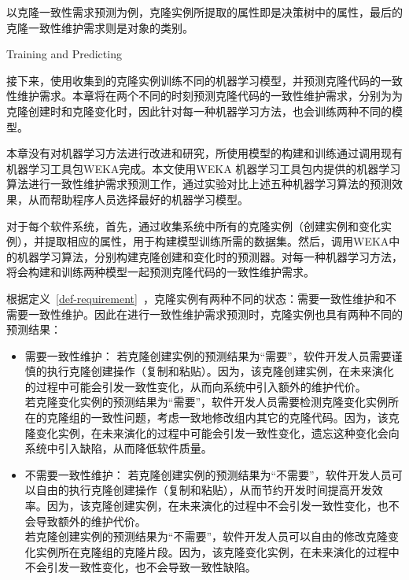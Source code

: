 { 以克隆一致性需求预测为例，克隆实例所提取的属性即是决策树中的属性，最后的克隆一致性维护需求则是对象的类别。

{Training and Predicting}

接下来，使用收集到的克隆实例训练不同的机器学习模型，并预测克隆代码的一致性维护需求。本章将在两个不同的时刻预测克隆代码的一致性维护需求，分别为为克隆创建时和克隆变化时，因此针对每一种机器学习方法，也会训练两种不同的模型。

本章没有对机器学习方法进行改进和研究，所使用模型的构建和训练通过调用现有机器学习工具包WEKA完成。本文使用WEKA 机器学习工具包内提供的机器学习算法进行一致性维护需求预测工作，通过实验对比上述五种机器学习算法的预测效果，从而帮助程序人员选择最好的机器学习模型。

对于每个软件系统，首先，通过收集系统中所有的克隆实例（创建实例和变化实例），并提取相应的属性，用于构建模型训练所需的数据集。然后，调用WEKA中的机器学习算法，分别构建克隆创建和变化时的预测器。对每一种机器学习方法，将会构建和训练两种模型一起预测克隆代码的一致性维护需求。

根据定义~\ref{def-requirement}~，克隆实例有两种不同的状态：需要一致性维护和不需要一致性维护。因此在进行一致性维护需求预测时，克隆实例也具有两种不同的预测结果：
\begin{itemize}
\item 
需要一致性维护：
若克隆创建实例的预测结果为“需要”，软件开发人员需要谨慎的执行克隆创建操作（复制和粘贴）。因为，该克隆创建实例，在未来演化的过程中可能会引发一致性变化，从而向系统中引入额外的维护代价。\\
若克隆变化实例的预测结果为“需要”，软件开发人员需要检测克隆变化实例所在的克隆组的一致性问题，考虑一致地修改组内其它的克隆代码。因为，该克隆变化实例，在未来演化的过程中可能会引发一致性变化，遗忘这种变化会向系统中引入缺陷，从而降低软件质量。
\item
不需要一致性维护：
若克隆创建实例的预测结果为“不需要”，软件开发人员可以自由的执行克隆创建操作（复制和粘贴），从而节约开发时间提高开发效率。因为，该克隆创建实例，在未来演化的过程中不会引发一致性变化，也不会导致额外的维护代价。\\
若克隆创建实例的预测结果为“不需要”，软件开发人员可以自由的修改克隆变化实例所在克隆组的克隆片段。因为，该克隆变化实例，在未来演化的过程中不会引发一致性变化，也不会导致一致性缺陷。
\end{itemize}


}
